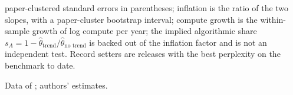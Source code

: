 \begin{table}[tp]
\begin{tablenotes}
paper-clustered standard errors in parentheses; inflation is the ratio of the two slopes, with a paper-cluster
bootstrap interval; compute growth is the within-sample growth of log compute per year; the implied algorithmic share
$s_A=1-\hat\theta_{\text{trend}}/\hat\theta_{\text{no trend}}$ is backed out of the inflation factor and is not an
independent test. Record setters are releases with the best perplexity on the benchmark to date.\end{tablenotes}
\begin{tablenotes}[Source]Data of \citet{ho2024algorithmic}; authors' estimates.\end{tablenotes}
\end{table}

